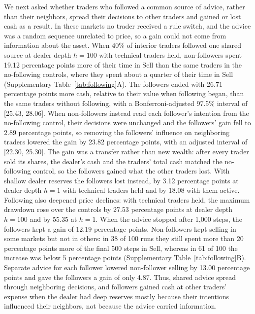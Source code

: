 We next asked whether traders who followed a common source of advice,
rather than their neighbors, spread their decisions to other traders and
gained or lost cash as a result. In these markets no trader received a
rule switch, and the advice was a random sequence unrelated to price, so
a gain could not come from information about the asset. When 40\% of
interior traders followed one shared source at dealer depth $h=100$ with
technical traders held, non-followers spent 19.12 percentage points more
of their time in Sell than the same traders in the no-following
controls, where they spent about a quarter of their time in Sell
(Supplementary Table~\ref{tab:following}A). The followers ended with
26.71 percentage points more cash, relative to their value when
following began, than the same traders without following, with a
Bonferroni-adjusted 97.5\% interval of [25.43, 28.06]. When non-followers
instead read each follower's intention from the no-following control,
their decisions were unchanged and the followers' gain fell to 2.89
percentage points, so removing the followers' influence on neighboring
traders lowered the gain by 23.82 percentage points, with an adjusted
interval of [22.30, 25.30]. The
gain was a transfer rather than new wealth: after every trader sold its
shares, the dealer's cash and the traders' total cash matched the
no-following control, so the followers gained what the other traders
lost. With shallow dealer reserves the followers lost instead, by 3.12
percentage points at dealer depth $h=1$ with technical traders held and
by 18.08 with them active. Following also deepened price declines: with
technical traders held, the maximum drawdown rose over the controls by
27.53 percentage points at dealer depth $h=100$ and by 55.35 at $h=1$.
When the advice stopped after 1,000 steps, the followers kept a gain of
12.19 percentage points. Non-followers kept selling in some markets but
not in others: in 38 of 100 runs they still spent more than 20
percentage points more of the final 500 steps in Sell, whereas in 61 of
100 the increase was below 5 percentage points (Supplementary
Table~\ref{tab:following}B). Separate
advice for each follower lowered non-follower selling by 13.00
percentage points and gave the followers a gain of only 4.87. Thus,
shared advice spread through neighboring decisions, and followers gained
cash at other traders' expense when the dealer had deep reserves mostly
because their intentions influenced their neighbors, not because the
advice carried information.

